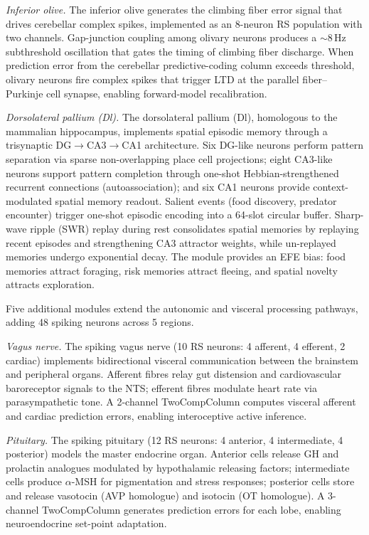 \documentclass[12pt]{article}
\begin{document}
\emph{Inferior olive.}
The inferior olive generates the climbing fiber error signal that drives
cerebellar complex spikes, implemented as an 8-neuron RS population with
two channels.
Gap-junction coupling among olivary neurons produces a $\sim$8\,Hz
subthreshold oscillation that gates the timing of climbing fiber discharge.
When prediction error from the cerebellar predictive-coding column exceeds
threshold, olivary neurons fire complex spikes that trigger LTD at the
parallel fiber--Purkinje cell synapse, enabling forward-model recalibration.

\emph{Dorsolateral pallium (Dl).}
The dorsolateral pallium (Dl), homologous to the mammalian hippocampus,
implements spatial episodic memory through a trisynaptic DG$\to$CA3$\to$CA1
architecture.
Six DG-like neurons perform pattern separation via sparse non-overlapping
place cell projections; eight CA3-like neurons support pattern completion
through one-shot Hebbian-strengthened recurrent connections
(autoassociation); and six CA1 neurons provide context-modulated spatial
memory readout.
Salient events (food discovery, predator encounter) trigger one-shot
episodic encoding into a 64-slot circular buffer.
Sharp-wave ripple (SWR) replay during rest consolidates spatial memories
by replaying recent episodes and strengthening CA3 attractor weights,
while un-replayed memories undergo exponential decay.
The module provides an EFE bias: food memories attract foraging, risk
memories attract fleeing, and spatial novelty attracts exploration.

Five additional modules extend the autonomic and visceral processing
pathways, adding 48 spiking neurons across 5 regions.

\emph{Vagus nerve.}
The spiking vagus nerve (10 RS neurons: 4 afferent, 4 efferent,
2 cardiac) implements bidirectional visceral communication between the
brainstem and peripheral organs.
Afferent fibres relay gut distension and cardiovascular baroreceptor
signals to the NTS; efferent fibres modulate heart rate via
parasympathetic tone.
A 2-channel TwoCompColumn computes visceral afferent and cardiac
prediction errors, enabling interoceptive active inference.

\emph{Pituitary.}
The spiking pituitary (12 RS neurons: 4 anterior, 4 intermediate,
4 posterior) models the master endocrine organ.
Anterior cells release GH and prolactin analogues modulated by
hypothalamic releasing factors; intermediate cells produce
$\alpha$-MSH for pigmentation and stress responses; posterior cells
store and release vasotocin (AVP homologue) and isotocin (OT homologue).
A 3-channel TwoCompColumn generates prediction errors for each lobe,
enabling neuroendocrine set-point adaptation.
\end{document}
